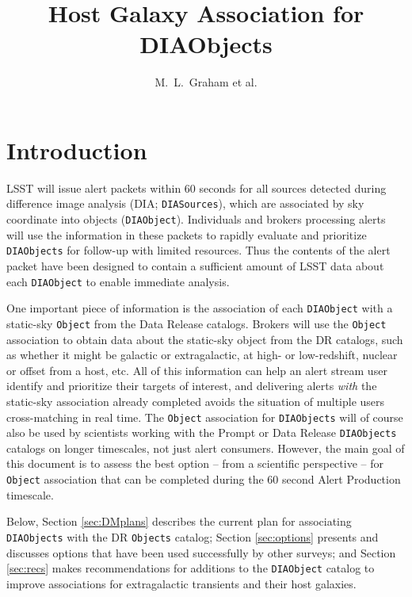 \documentclass[DM,authoryear,toc]{lsstdoc}
\title{Host Galaxy Association for DIAObjects}
\author{%
M.~L.~Graham et al.
}
\date{\vcsDate}
\begin{document}
\maketitle

\section{Introduction} \label{sec:intro}

LSST will issue alert packets within $60$ seconds for all sources detected during difference image analysis (DIA; {\tt DIASources}), which are associated by sky coordinate into objects ({\tt DIAObject}). 
Individuals and brokers processing alerts will use the information in these packets to rapidly evaluate and prioritize {\tt DIAObjects} for follow-up with limited resources.
Thus the contents of the alert packet have been designed to contain a sufficient amount of LSST data about each {\tt DIAObject} to enable immediate analysis.

One important piece of information is the association of each {\tt DIAObject} with a static-sky {\tt Object} from the Data Release catalogs.
Brokers will use the {\tt Object} association to obtain data about the static-sky object from the DR catalogs, such as whether it might be galactic or extragalactic, at high- or low-redshift, nuclear or offset from a host, etc.
All of this information can help an alert stream user identify and prioritize their targets of interest, and delivering alerts \emph{with} the static-sky association already completed avoids the situation of multiple users cross-matching in real time.
The {\tt Object} association for {\tt DIAObjects} will of course also be used by scientists working with the Prompt or Data Release {\tt DIAObjects} catalogs on longer timescales, not just alert consumers.
However, the main goal of this document is to assess the best option -- from a scientific perspective -- for {\tt Object} association that can be completed during the 60 second Alert Production timescale.

Below, Section \ref{sec:DMplans} describes the current plan for associating {\tt DIAObjects} with the DR {\tt Objects} catalog; Section \ref{sec:options} presents and discusses options that have been used successfully by other surveys; and Section \ref{sec:recs} makes recommendations for additions to the {\tt DIAObject} catalog to improve associations for extragalactic transients and their host galaxies.
\end{document}
